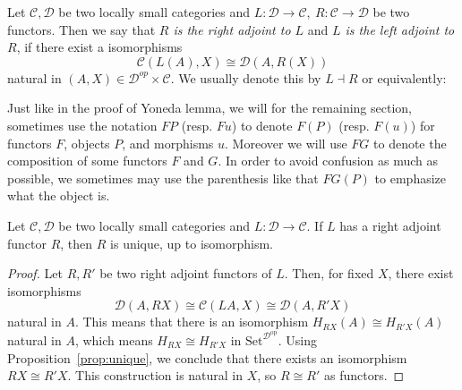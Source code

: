 \begin{definition}[2.1.1]\label{def:adj} Let $\mathcal{C},\mathcal{D}$ be two locally small categories and $L:\mathcal{D}\to\mathcal{C},\ R:\mathcal{C}\to\mathcal{D}$ be two functors. Then we say that \emph{$R$ is the right adjoint to $L$} and \emph{$L$ is the left adjoint to $R$}, if there exist a isomorphisms
\[\mathcal{C}(L(A),X)\cong\mathcal{D}(A,R(X))\]
natural in $(A,X)\in\mathcal{D}^{op}\times\mathcal{C}$. We usually denote this by $L\dashv R$ or equivalently:
\vspace*{-0.2em}
\begin{center}
\end{center}
\end{definition}
\begin{notation} Just like in the proof of Yoneda lemma, we will for the remaining section, sometimes use the notation $FP$ (resp. $Fu$) to denote $F(P)$ (resp. $F(u)$) for functors $F$, objects $P$, and morphisms $u$. Moreover we will use $FG$ to denote the composition of some functors $F$ and $G$. In order to avoid confusion as much as possible, we sometimes may use the parenthesis like that $FG(P)$ to emphasize what the object is.
\end{notation}

\begin{proposition}[4.3.13] Let $\mathcal{C},\mathcal{D}$ be two locally small categories and $L:\mathcal{D}\to\mathcal{C}$. If $L$ has a right adjoint functor $R$, then $R$ is unique, up to isomorphism.
\end{proposition}
\begin{proof} Let $R,R'$ be two right adjoint functors of $L$. Then, for fixed $X$, there exist isomorphisms
\[\mathcal{D}(A,RX)\cong\mathcal{C}(LA,X)\cong\mathcal{D}(A,R'X)\]
natural in $A$. This means that there is an isomorphism $H_{RX}(A)\cong H_{R'X}(A)$ natural in $A$, which means $H_{RX}\cong H_{R'X}$ in $\mathrm{Set}^{\mathcal{D}^{\mathrm{op}}}$. Using Proposition~\ref{prop:unique}, we conclude that there exists an isomorphism $RX\cong R'X$. This construction is natural in $X$, so $R\cong R'$ as functors.
\end{proof}

